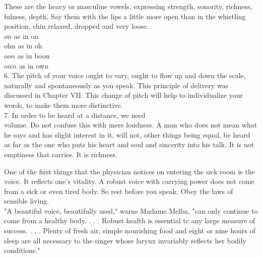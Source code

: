 \documentclass[10pt]{article}
\begin{document}
These are the heavy or masculine vowels, expressing strength, sonority, richness, fulness, depth. Say them with the lips a little more open than in the whistling position, chin relaxed, dropped and very loose.\\
$o n$ as in on\\
ohn as in oh\\
$o o n$ as in boon\\
$o w n$ as in own\\
6. The pitch of your voice ought to vary, ought to flow up and down the scale, naturally and spontaneously as you speak. This principle of delivery was discussed in Chapter VII. This change of pitch will help to individualize your words, to make them more distinctive.\\
7. In order to be heard at a distance, we need\\
volume. Do not confuse this with mere loudness. A man who does not mean what he says and has slight interest in it, will not, other things being equal, be heard as far as the one who puts his heart and soul and sincerity into his talk. It is not emptiness that carries. It is richness.

One of the first things that the physician notices on entering the sick room is the voice. It reflects one's vitality. A robust voice with carrying power does not come from a sick or even tired body. So rest before you speak. Obey the laws of sensible living.\\
"A beautiful voice, beautifully used," warns Madame Melba, "can only continue to come from a healthy body. . . . Robust health is essential tc any large measure of success. . . . Plenty of fresh air, simple nourishing food and eight or nine hours of sleep are all necessary to the singer whose larynx invariably reflects her bodily conditions."
\end{document}

